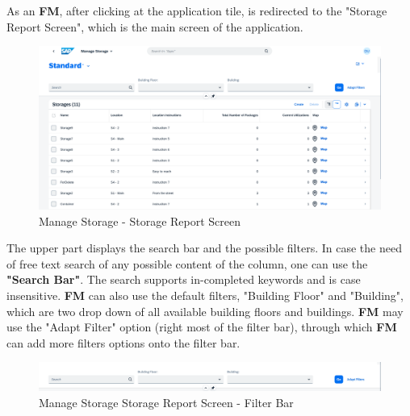 As an \textbf{FM}, after clicking at the application tile, is redirected to the "Storage Report Screen", which is the main screen of the application. 

\begin{figure}[H]
	\centering
	\includegraphics[width=1\linewidth]{images/user_doc/storage/StorageReportPage/reportDefaultOverview.png}
	\caption{Manage Storage - Storage Report Screen}
	\label{fig:MSstorageReportPage}
\end{figure}

The upper part displays the search bar and the possible filters. 
In case the need of free text search of any possible content of the column, one can use the \textbf{"Search Bar"}. The search supports in-completed keywords and is case insensitive. 
\textbf{FM} can also use the default filters, "Building Floor" and "Building", which are two drop down of all available building floors and buildings. \textbf{FM} may use the "Adapt Filter" option (right most of the filter bar), through which \textbf{FM} can add more filters options onto the filter bar.


\begin{figure}[H]
	\centering
	\includegraphics[width=1\linewidth]{images/user_doc/storage/StorageReportPage/reportFilterBar.png}
	\caption{Manage Storage Storage Report Screen - Filter Bar}
	\label{fig:MCdetailOVerview}
\end{figure}

